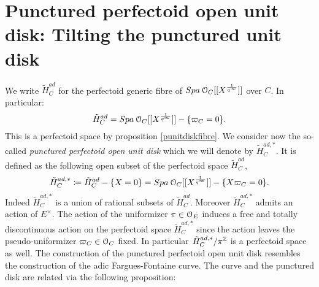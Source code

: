 \section{Punctured perfectoid open unit disk: Tilting the punctured unit disk}

We write 
$\tilde{H}^{ad}_{C}$ for the perfectoid generic fibre of  ${Spa{\:\mathcal{O}_C[[X^{\frac{1}{q^\infty}}]]}}$ over $C$.
In particular:
$$\tilde{H}^{ad}_{C} = {Spa{\:\mathcal{O}_C[[X^{\frac{1}{q^\infty}}]]}}-\{\varpi_C=0\}.$$
This is a perfectoid space by proposition \ref{punitdiskfibre}.
We consider now the so-called \emph{punctured perfectoid open unit disk} which we will denote by $\tilde{H}^{ad, *}_{C}$.
It is defined as the following open subset of the perfectoid space $\tilde{H}^{ad}_{C}$,
\[\tilde{H}^{ad, *}_{C}\coloneqq \tilde{H}^{ad}_{C}-\{X=0\} = {Spa{\:\mathcal{O}_C[[X^{\frac{1}{q^\infty}}]]}}-\{X\varpi_C=0\}.\]
Indeed $\tilde{H}^{ad, *}_{C}$ is a union of rational subsets of $\tilde{H}^{ad}_{C}$.
Moreover $\tilde{H}^{ad, *}_{C}$ admits an action of $E^{\times}$. %
The action of the uniformizer $\pi\in\mathcal{O}_E$ induces a 
free and totally discontinuous action on the perfectoid space $\tilde{H}^{ad, *}_{C}$ since the action leaves the pseudo-uniformizer $\varpi_C\in\mathcal{O}_C$ fixed. 
In particular $\tilde{H}^{ad, *}_{C}/\pi^{\mathbb{Z}}$ is a perfectoid space as well. 
The construction of the punctured perfectoid open unit disk resembles the construction of the adic Fargues-Fontaine curve. The curve and the punctured disk are related via the following proposition:

